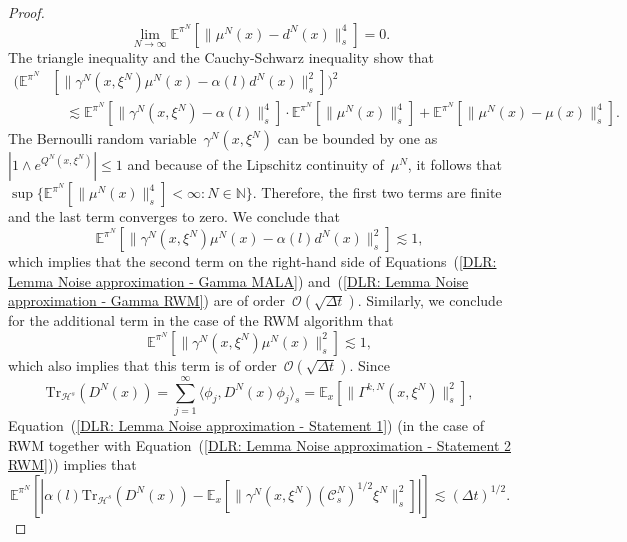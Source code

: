 \begin{proof}
  \begin{equation*}
    \lim_{N \to \infty} \mathbb{E}^{\pi^N}[ \|  \mu^N(x) - d^N(x)\|_{s}^4] = 0.
  \end{equation*} The triangle inequality and the Cauchy-Schwarz inequality show that
  \begin{align*}
   ( \mathbb{E}^{\pi^N} &[  \| \gamma^N(x, \xi^N) \mu^N(x) - \alpha(l) d^N(x)  \|_s^2] )^2 \\
   & \quad \lesssim  \mathbb{E}^{\pi^N}[  \|\gamma^N(x, \xi^N) - \alpha(l)\|_s^4 ] \cdot  \mathbb{E}^{\pi^N}[ \| \mu^N(x)  \|_s^4 ]  +  \mathbb{E}^{\pi^N}[ \| \mu^N(x)  - \mu(x) \|_s^4 ].
  \end{align*}
  The Bernoulli random variable~$\gamma^N(x, \xi^N)$ can be bounded by one as $|1 \wedge e^{Q^N(x, \xi^N)}| \leq 1$ and because of the Lipschitz continuity of~$\mu^N$, it follows that~$\sup \{ \mathbb{E}^{\pi^N}[\| \mu^N(x) \|_s^4] < \infty : N \in \mathbb{N} \}$. Therefore, the first two terms are finite and the last term converges to zero. We conclude that
  \begin{equation}
    \label{DLR: Lemma Noise approximation - Statement 1}
   \mathbb{E}^{\pi^N} [  \| \gamma^N(x, \xi^N) \mu^N(x) - \alpha(l) d^N(x)  \|_s^2] \lesssim 1,
  \end{equation}
  which implies that the second term on the right-hand side of Equations~(\ref{DLR: Lemma Noise approximation - Gamma MALA}) and~(\ref{DLR: Lemma Noise approximation - Gamma RWM}) are of order~$\mathcal{O}(\sqrt{\Delta t})$. Similarly, we conclude for the additional term in the case of the RWM algorithm that
  \begin{equation}
     \label{DLR: Lemma Noise approximation - Statement 2 RWM}
   \mathbb{E}^{\pi^N} [  \| \gamma^N(x, \xi^N) \mu^N(x) \|_s^2 ] \lesssim 1,
  \end{equation}
  which also implies that this term is of order~$\mathcal{O}(\sqrt{\Delta t})$. Since 
  \begin{equation*}
   \text{Tr}_{\mathcal{H}^s} (D^N(x)) = \sum_{j=1}^{\infty} \langle \phi_j, D^N(x)\phi_j \rangle_s = \mathbb{E}_x[\| \Gamma^{k,N}(x, \xi^N) \|_s^2],
  \end{equation*}
  Equation~(\ref{DLR: Lemma Noise approximation - Statement 1}) (in the case of RWM together with Equation~(\ref{DLR: Lemma Noise approximation - Statement 2 RWM})) implies that
  \begin{equation}
    \mathbb{E}^{\pi^N}[| \alpha(l)  \text{Tr}_{\mathcal{H}^s} (D^N(x)) - \mathbb{E}_x[ \| \gamma^N(x, \xi^N) (\mathcal{C}_s^N)^{1/2} \xi^N \|_s^2] |] \lesssim (\Delta t)^{1/2}.

\end{equation}
\end{proof}
